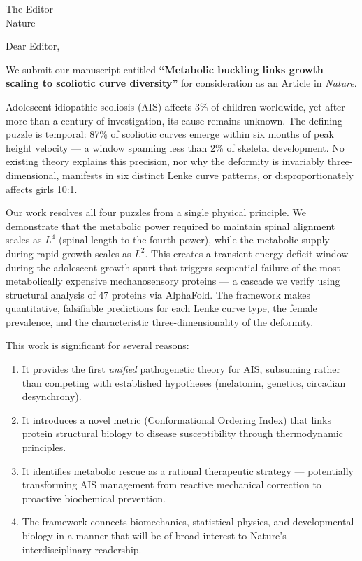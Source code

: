 \documentclass[12pt]{letter}
\begin{document}
\begin{letter}{The Editor\\Nature}

\opening{Dear Editor,}

We submit our manuscript entitled \textbf{``Metabolic buckling links growth scaling to scoliotic curve diversity''} for consideration as an Article in \textit{Nature}.

Adolescent idiopathic scoliosis (AIS) affects 3\% of children worldwide, yet after more than a century of investigation, its cause remains unknown. The defining puzzle is temporal: 87\% of scoliotic curves emerge within six months of peak height velocity --- a window spanning less than 2\% of skeletal development. No existing theory explains this precision, nor why the deformity is invariably three-dimensional, manifests in six distinct Lenke curve patterns, or disproportionately affects girls 10:1.

Our work resolves all four puzzles from a single physical principle. We demonstrate that the metabolic power required to maintain spinal alignment scales as $L^4$ (spinal length to the fourth power), while the metabolic supply during rapid growth scales as $L^2$. This creates a transient energy deficit window during the adolescent growth spurt that triggers sequential failure of the most metabolically expensive mechanosensory proteins --- a cascade we verify using structural analysis of 47 proteins via AlphaFold. The framework makes quantitative, falsifiable predictions for each Lenke curve type, the female prevalence, and the characteristic three-dimensionality of the deformity.

This work is significant for several reasons:
\begin{enumerate}
\item It provides the first \textit{unified} pathogenetic theory for AIS, subsuming rather than competing with established hypotheses (melatonin, genetics, circadian desynchrony).
\item It introduces a novel metric (Conformational Ordering Index) that links protein structural biology to disease susceptibility through thermodynamic principles.
\item It identifies metabolic rescue as a rational therapeutic strategy --- potentially transforming AIS management from reactive mechanical correction to proactive biochemical prevention.
\item The framework connects biomechanics, statistical physics, and developmental biology in a manner that will be of broad interest to Nature's interdisciplinary readership.
\end{enumerate}


\end{letter}
\end{document}
